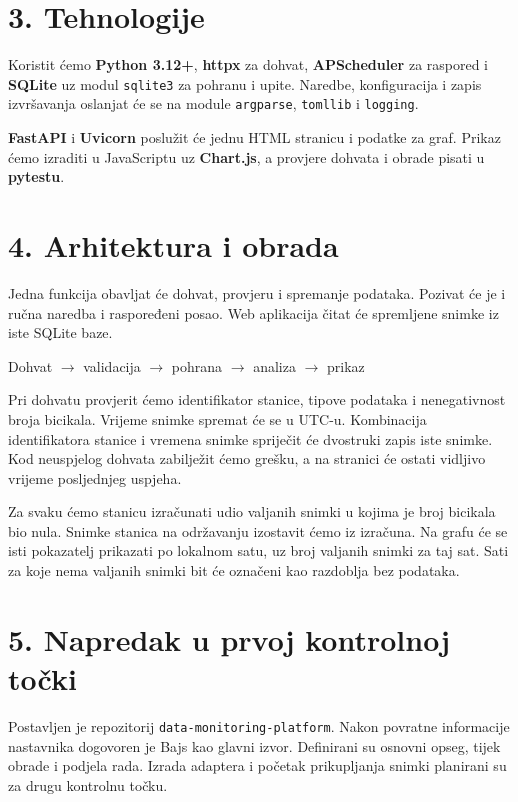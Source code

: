 \documentclass[a4paper,11pt]{article}
\begin{document}
\section*{3. Tehnologije}
Koristit ćemo \textbf{Python 3.12+}, \textbf{httpx} za dohvat,
\textbf{APScheduler} za raspored i \textbf{SQLite} uz modul
\texttt{sqlite3} za pohranu i upite. Naredbe, konfiguracija i zapis
izvršavanja oslanjat će se na module \texttt{argparse}, \texttt{tomllib}
i \texttt{logging}.

\textbf{FastAPI} i \textbf{Uvicorn} poslužit će jednu HTML stranicu i
podatke za graf. Prikaz ćemo izraditi u JavaScriptu uz \textbf{Chart.js},
a provjere dohvata i obrade pisati u \textbf{pytestu}.

\newpage
\section*{4. Arhitektura i obrada}
Jedna funkcija obavljat će dohvat, provjeru i spremanje podataka. Pozivat
će je i ručna naredba i raspoređeni posao. Web aplikacija čitat će
spremljene snimke iz iste SQLite baze.

\begin{center}
\small Dohvat $\rightarrow$ validacija $\rightarrow$ pohrana
$\rightarrow$ analiza $\rightarrow$ prikaz
\end{center}

Pri dohvatu provjerit ćemo identifikator stanice, tipove podataka i
nenegativnost broja bicikala. Vrijeme snimke spremat će se u UTC-u.
Kombinacija identifikatora stanice i vremena snimke spriječit će
dvostruki zapis iste snimke. Kod neuspjelog dohvata zabilježit ćemo
grešku, a na stranici će ostati vidljivo vrijeme posljednjeg uspjeha.

Za svaku ćemo stanicu izračunati udio valjanih snimki u kojima je broj
bicikala bio nula. Snimke stanica na održavanju izostavit ćemo iz
izračuna. Na grafu će se isti pokazatelj prikazati po lokalnom satu,
uz broj valjanih snimki za taj sat. Sati za koje nema valjanih snimki
bit će označeni kao razdoblja bez podataka.

\section*{5. Napredak u prvoj kontrolnoj točki}
Postavljen je repozitorij \texttt{data-monitoring-platform}. Nakon
povratne informacije nastavnika dogovoren je Bajs kao glavni izvor.
Definirani su osnovni opseg, tijek obrade i podjela rada. Izrada
adaptera i početak prikupljanja snimki planirani su za drugu
kontrolnu točku.
\end{document}
